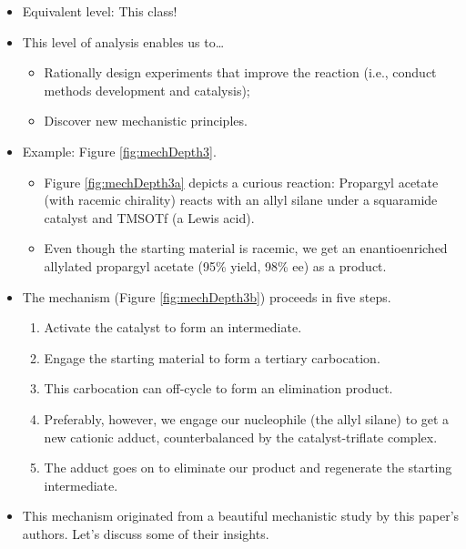 \documentclass[../notes.tex]{subfiles}
\begin{document}
\begin{itemize}
\begin{enumerate}
\begin{figure}[h!]
        \end{figure}
        \pagebreak
        \begin{itemize}
            \item Equivalent level: This class!
            \item This level of analysis enables us to\dots
            \begin{itemize}
                \item Rationally design experiments that improve the reaction (i.e., conduct methods development and catalysis);
                \item Discover new mechanistic principles.
            \end{itemize}
            \item Example: Figure \ref{fig:mechDepth3}.
            \begin{itemize}
                \item Figure \ref{fig:mechDepth3a} depicts a curious reaction: Propargyl acetate (with racemic chirality) reacts with an allyl silane under a squaramide catalyst and TMSOTf (a Lewis acid).
                \item Even though the starting material is racemic, we get an enantioenriched allylated propargyl acetate (95\% yield, 98\% ee) as a product.
            \end{itemize}
            \item The mechanism (Figure \ref{fig:mechDepth3b}) proceeds in five steps.
            \begin{enumerate}[label={(\arabic*)}]
                \item Activate the catalyst to form an intermediate.
                \item Engage the starting material to form a tertiary carbocation.
                \item This carbocation can off-cycle to form an elimination product.
                \item Preferably, however, we engage our nucleophile (the allyl silane) to get a new cationic adduct, counterbalanced by the catalyst-triflate complex.
                \item The adduct goes on to eliminate our product and regenerate the starting intermediate.
            \end{enumerate}
            \item This mechanism originated from a beautiful mechanistic study by this paper's authors. Let's discuss some of their insights.
            \begin{enumerate}[label={(\arabic*)}]

\end{enumerate}
\end{itemize}
\end{enumerate}
\end{itemize}
\end{document}
